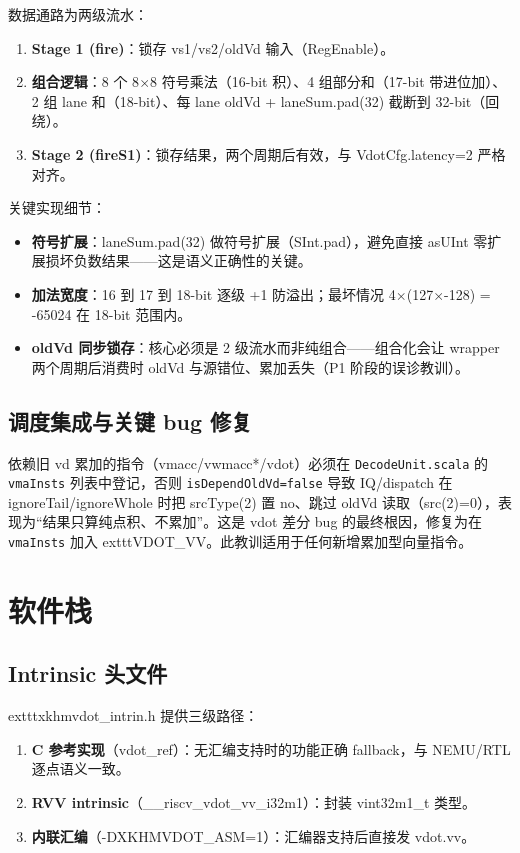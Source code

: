 \documentclass[11pt]{article}
\begin{document}
数据通路为两级流水：
\begin{enumerate}
  \item \textbf{Stage 1 (fire)}：锁存 vs1/vs2/oldVd 输入（RegEnable）。
  \item \textbf{组合逻辑}：8 个 8$\times$8 符号乘法（16-bit 积）、4 组部分和（17-bit 带进位加）、2 组 lane 和（18-bit）、每 lane oldVd + laneSum.pad(32) 截断到 32-bit（回绕）。
  \item \textbf{Stage 2 (fireS1)}：锁存结果，两个周期后有效，与 VdotCfg.latency=2 严格对齐。
\end{enumerate}

关键实现细节：
\begin{itemize}
  \item \textbf{符号扩展}：laneSum.pad(32) 做符号扩展（SInt.pad），避免直接 asUInt 零扩展损坏负数结果——这是语义正确性的关键。
  \item \textbf{加法宽度}：16 到 17 到 18-bit 逐级 +1 防溢出；最坏情况 4$\times$(127$\times$-128) = -65024 在 18-bit 范围内。
  \item \textbf{oldVd 同步锁存}：核心必须是 2 级流水而非纯组合——组合化会让 wrapper 两个周期后消费时 oldVd 与源错位、累加丢失（P1 阶段的误诊教训）。
\end{itemize}

\subsection{调度集成与关键 bug 修复}
依赖旧 vd 累加的指令（vmacc/vwmacc*/vdot）必须在 \texttt{DecodeUnit.scala} 的 \texttt{vmaInsts} 列表中登记，否则 \texttt{isDependOldVd=false} 导致 IQ/dispatch 在 ignoreTail/ignoreWhole 时把 srcType(2) 置 no、跳过 oldVd 读取（src(2)=0），表现为“结果只算纯点积、不累加”。这是 vdot 差分 bug 的最终根因，修复为在 \texttt{vmaInsts} 加入 	exttt{VDOT\_VV}。此教训适用于任何新增累加型向量指令。

\section{软件栈}
\subsection{Intrinsic 头文件}
	exttt{xkhmvdot\_intrin.h} 提供三级路径：
\begin{enumerate}
  \item \textbf{C 参考实现}（vdot\_ref）：无汇编支持时的功能正确 fallback，与 NEMU/RTL 逐点语义一致。
  \item \textbf{RVV intrinsic}（\_\_riscv\_vdot\_vv\_i32m1）：封装 vint32m1\_t 类型。
  \item \textbf{内联汇编}（-DXKHMVDOT\_ASM=1）：汇编器支持后直接发 vdot.vv。
\end{enumerate}
\end{document}
